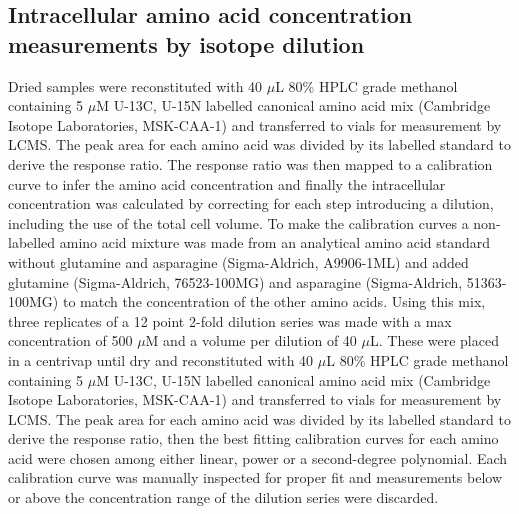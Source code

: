 \subsection{Intracellular amino acid concentration measurements by isotope dilution}
Dried samples were reconstituted with 40 $\mu$L 80\% HPLC grade methanol containing 5 $\mu$M U-13C, U-15N labelled canonical amino acid mix (Cambridge Isotope Laboratories, MSK-CAA-1) and transferred to vials for measurement by LCMS.
The peak area for each amino acid was divided by its labelled standard to derive the response ratio.
The response ratio was then mapped to a calibration curve to infer the amino acid concentration and finally the intracellular concentration was calculated by correcting for each step introducing a dilution, including the use of the total cell volume.
To make the calibration curves a non-labelled amino acid mixture was made from an analytical amino acid standard without glutamine and asparagine (Sigma-Aldrich, A9906-1ML) and added glutamine (Sigma-Aldrich, 76523-100MG) and asparagine (Sigma-Aldrich, 51363-100MG) to match the concentration of the other amino acids.
Using this mix, three replicates of a 12 point 2-fold dilution series was made with a max concentration of 500 $\mu$M and a volume per dilution of 40 $\mu$L.
These were placed in a centrivap until dry and reconstituted with 40 $\mu$L 80\% HPLC grade methanol containing 5 $\mu$M U-13C, U-15N labelled canonical amino acid mix (Cambridge Isotope Laboratories, MSK-CAA-1) and transferred to vials for measurement by LCMS.
The peak area for each amino acid was divided by its labelled standard to derive the response ratio, then the best fitting calibration curves for each amino acid were chosen among either linear, power or a second-degree polynomial.
Each calibration curve was manually inspected for proper fit and measurements below or above the concentration range of the dilution series were discarded.

